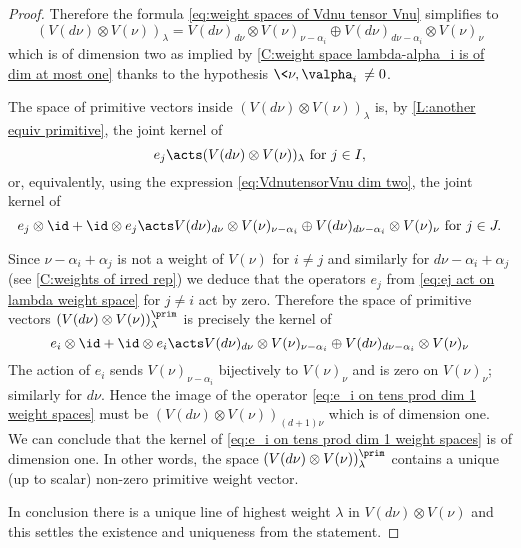 \documentclass[reqno, 10pt]{amsart}
\theoremstyle{plain}
\theoremstyle{definition}
\numberwithin{equation}{section}%
\begin{document}
\begin{proof}
	Therefore the formula \eqref{eq:weight spaces of Vdnu tensor Vnu} simplifies to
	\begin{equation}\label{eq:VdnutensorVnu dim two}
	(V(d\nu)\otimes V(\nu))_\lambda = V(d\nu)_{d\nu}\otimes V(\nu)_{\nu-\alpha_{i}}\oplus V(d\nu)_{d\nu-\alpha_{i}}\otimes V(\nu)_{\nu}
	\end{equation} 
	which is of dimension two as implied by \cref{C:weight space lambda-alpha_i is of dim at most one} thanks to the hypothesis $\<\nu,\valpha_i\>\neq 0$.
	
	The space of primitive vectors inside $(V(d\nu)\otimes V(\nu))_\lambda$ is, by \cref{L:another equiv primitive}, the joint kernel of
	\begin{equation}\label{eq:ej act on lambda weight space}
		e_j\acts (V(d\nu)\otimes V(\nu))_\lambda \text{ for }j\in I,
	\end{equation}
	or, equivalently, using the expression \eqref{eq:VdnutensorVnu dim two}, the joint kernel of
	\begin{equation}
		e_j\otimes \id+\id\otimes e_j\acts V(d\nu)_{d\nu}\otimes V(\nu)_{\nu-\alpha_{i}}\oplus V(d\nu)_{d\nu-\alpha_{i}}\otimes V(\nu)_{\nu} \text{ for } j \in J.
	\end{equation}

	Since $\nu-\alpha_i+\alpha_j$ is not a weight of $V(\nu)$ for $i\neq j$ and similarly for $d\nu-\alpha_i+\alpha_j$ (see \cref{C:weights of irred rep}) 
	we deduce that the operators $e_j$ from \eqref{eq:ej act on lambda weight space} for $j\neq i$ act by zero.
	Therefore the space of primitive vectors $(V(d\nu)\otimes V(\nu))_\lambda^\prim$ is precisely the kernel of
	\begin{equation}\label{eq:e_i on tens prod dim 1 weight spaces}
		e_i\otimes\id+\id\otimes e_i\acts V(d\nu)_{d\nu}\otimes V(\nu)_{\nu-\alpha_{i}}\oplus V(d\nu)_{d\nu-\alpha_{i}}\otimes V(\nu)_{\nu}
	\end{equation}
	The action of $e_i$ sends $V(\nu)_{\nu-\alpha_i}$ bijectively to $V(\nu)_\nu$ and is zero on $V(\nu)_\nu$; similarly for $d\nu$.
	Hence the image of the operator \eqref{eq:e_i on tens prod dim 1 weight spaces} must be $(V(d\nu)\otimes V(\nu))_{(d+1)\nu}$ which is of dimension one. 
	We can conclude that the kernel of \eqref{eq:e_i on tens prod dim 1 weight spaces} is of dimension one.
	In other words, the space $(V(d\nu)\otimes V(\nu))_\lambda^\prim$ contains a unique (up to scalar) non-zero primitive weight vector.
			
	In conclusion there is a unique line of highest weight $\lambda$ in $V(d\nu)\otimes V(\nu)$ and this settles the existence and uniqueness from the statement.
\end{proof}
\end{document}
